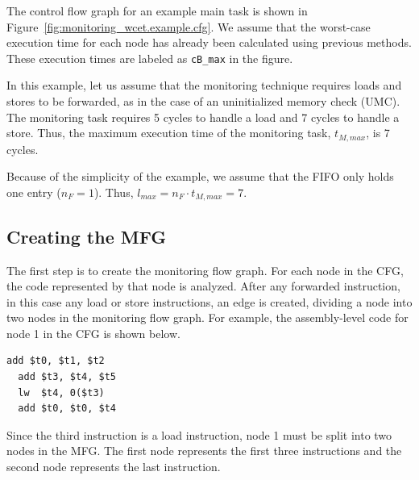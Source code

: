 The control flow graph for an example main task is shown in
Figure~\ref{fig:monitoring_wcet.example.cfg}. We assume that the worst-case
execution time for each node has already been calculated using previous
methods. These execution times are labeled as {\tt cB\_max} in the figure.

In this example, let us assume that the monitoring technique requires loads and
stores to be forwarded, as in the case of an uninitialized memory check (UMC).
The monitoring task requires 5 cycles to handle a load and 7 cycles to handle a
store. Thus, the maximum execution time of the monitoring task, $t_{M, max}$,
is 7 cycles.

Because of the simplicity of the example, we assume that the FIFO only holds
one entry ($n_F = 1$). Thus, $l_{max} = n_F \cdot t_{M, max} = 7$.

\subsection{Creating the MFG}

The first step is to create the monitoring flow graph. For each node in the
CFG, the code represented by that node is analyzed. After any forwarded
instruction, in this case any load or store instructions, an edge is created,
dividing a node into two nodes in the monitoring flow graph.  For example, the
assembly-level code for node 1 in the CFG is shown below.
\lstset{numbers=left, 
  firstnumber=1, 
  xleftmargin=2em, 
  numbersep=1em, 
  basicstyle=\ttfamily, 
  title=node 1, 
  } 
\begin{lstlisting}[frame=tb]
  add $t0, $t1, $t2
  add $t3, $t4, $t5
  lw  $t4, 0($t3)
  add $t0, $t0, $t4
\end{lstlisting}
Since the third instruction is a load instruction, node 1 must be split into
two nodes in the MFG. The first node represents the first three instructions
and the second node represents the last instruction. 

